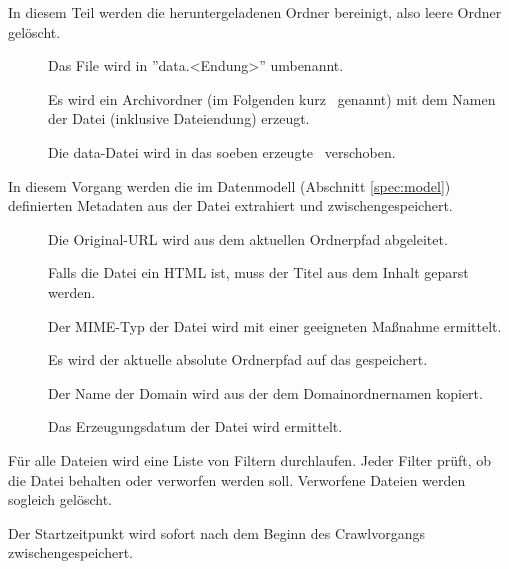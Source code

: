\begin{description}
\begin{description}
		\end{description}
	\item [\req{Bereinigung}{clean}]
		In diesem Teil werden die heruntergeladenen Ordner bereinigt,
		also leere Ordner gelöscht.
	\item [\req{Normalisierung}{normalize}]
		\begin{description}
			\item []
				Das File wird in ''data.<Endung>'' umbenannt. 
			\item [] 
				Es wird ein Archivordner (im Folgenden kurz \arc\ genannt) 
				mit dem Namen der Datei (inklusive Dateiendung) 
				erzeugt.
			\item []
				Die data-Datei wird in das soeben erzeugte \arc\ verschoben.
		\end{description}
	\item [\req{Extraktion der Metadaten}{metaextract}]
		In diesem Vorgang werden die im Datenmodell (Abschnitt \ref{spec:model}) 
		definierten Metadaten 
		aus der Datei extrahiert und zwischengespeichert. 
		\begin{description}
			\item []
				Die Original-URL wird aus dem aktuellen Ordnerpfad abgeleitet.
			\item []
				Falls die Datei ein HTML ist, 
				muss der Titel aus dem Inhalt geparst werden.
			\item []
				Der MIME-Typ der Datei wird mit einer geeigneten Maßnahme ermittelt.
			\item []
				Es wird der aktuelle absolute Ordnerpfad auf das \arc gespeichert.
			\item []
				Der Name der Domain wird aus der dem Domainordnernamen kopiert.
			\item []
				Das Erzeugungsdatum der Datei wird ermittelt.
		\end{description}
	\item [\req{Filterung}{filter}]
		Für alle Dateien wird eine Liste von Filtern durchlaufen.
		Jeder Filter prüft, ob die Datei behalten oder verworfen werden soll.
		Verworfene Dateien werden sogleich gelöscht.
	\item [\req{commitTime speichern}{commitTime}]
		Der Startzeitpunkt wird sofort nach dem Beginn des Crawlvorgangs zwischengespeichert.

\end{description}
